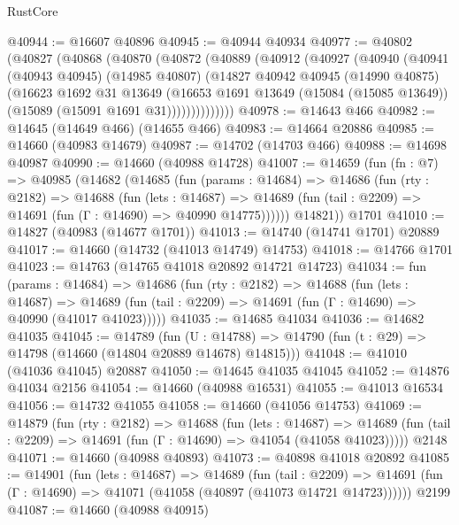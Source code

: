 \begin{lexlean}{RustCore}
\begin{coremodule}
@40944 := @16607 @40896
@40945 := @40944 @40934
@40977 := @40802
    (@40827
      (@40868
        (@40870
          (@40872
            (@40889
              (@40912
                (@40927
                  (@40940
                    (@40941
                      (@40943 @40945)
                      (@14985 @40807)
                      (@14827
                        @40942
                        @40945
                        (@14990 @40875)
                        (@16623
                          @1692
                          @31
                          @13649
                          (@16653
                            @1691
                            @13649
                            (@15084 (@15085 @13649))
                            (@15089 (@15091 @1691 @31))))))))))))))
@40978 := @14643 @466
@40982 := @14645 (@14649 @466) (@14655 @466)
@40983 := @14664 @20886
@40985 := @14660 (@40983 @14679)
@40987 := @14702 (@14703 @466)
@40988 := @14698 @40987
@40990 := @14660 (@40988 @14728)
@41007 := @14659
    (fun (fn : @7) =>
    @40985
      (@14682
        (@14685
          (fun (params : @14684) =>
          @14686
            (fun (rty : @2182) =>
            @14688
              (fun (lets : @14687) =>
              @14689 (fun (tail : @2209) => @14691 (fun (Γ : @14690) => @40990 @14775))))))
        @14821))
    @1701
@41010 := @14827 (@40983 (@14677 @1701))
@41013 := @14740 (@14741 @1701) @20889
@41017 := @14660 (@14732 (@41013 @14749) @14753)
@41018 := @14766 @1701
@41023 := @14763 (@14765 @41018 @20892 @14721 @14723)
@41034 := fun (params : @14684) =>
  @14686
    (fun (rty : @2182) =>
    @14688
      (fun (lets : @14687) =>
      @14689 (fun (tail : @2209) => @14691 (fun (Γ : @14690) => @40990 (@41017 @41023)))))
@41035 := @14685 @41034
@41036 := @14682 @41035
@41045 := @14789
    (fun (U : @14788) => @14790 (fun (t : @29) => @14798 (@14660 (@14804 @20889 @14678) @14815)))
@41048 := @41010 (@41036 @41045) @20887
@41050 := @14645 @41035 @41045
@41052 := @14876 @41034 @2156
@41054 := @14660 (@40988 @16531)
@41055 := @41013 @16534
@41056 := @14732 @41055
@41058 := @14660 (@41056 @14753)
@41069 := @14879
    (fun (rty : @2182) =>
    @14688
      (fun (lets : @14687) =>
      @14689 (fun (tail : @2209) => @14691 (fun (Γ : @14690) => @41054 (@41058 @41023)))))
    @2148
@41071 := @14660 (@40988 @40893)
@41073 := @40898 @41018 @20892
@41085 := @14901
    (fun (lets : @14687) =>
    @14689
      (fun (tail : @2209) =>
      @14691 (fun (Γ : @14690) => @41071 (@41058 (@40897 (@41073 @14721 @14723))))))
    @2199
@41087 := @14660 (@40988 @40915)

\end{coremodule}
\end{lexlean}
